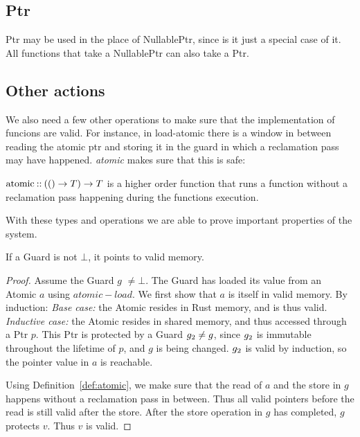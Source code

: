 \subsection{Ptr}

Ptr may be used in the place of NullablePtr, since is it just a special case of it. All functions
that take a NullablePtr can also take a Ptr.


\subsection{Other actions}

We also need a few other operations to make sure that the implementation of funcions are valid.
For instance, in load-atomic there is a window in between reading the atomic ptr and storing it in
the guard in which a reclamation pass may have happened. \emph{atomic} makes sure that this is
safe:
\begin{definition}\label{def:atomic}
  $\text{atomic\:::\:} (() \to T) \to T$ is a higher order function that runs a function without
  a reclamation pass happening during the functions execution.
\end{definition}


\clearpage





With these types and operations we are able to prove important properties of the system.

\begin{theorem}\label{thm:guard-valid}
  If a Guard is not $\bot$, it points to valid memory.
\end{theorem}
\begin{proof}
  Assume the Guard $g$ $\neq \bot$.
  The Guard has loaded its value from an Atomic $a$ using $atomic-load$.
We first show that $a$ is itself in valid memory. By induction:
\emph{Base case:} the Atomic resides in Rust memory, and is thus valid. \emph{Inductive case:} the
Atomic resides in shared memory, and thus accessed through a Ptr $p$.  This Ptr is protected by a
Guard $g\sb{2} \neq g$, since $g\sb{2}$ is immutable throughout the lifetime of $p$, and $g$ is
being changed. $g\sb{2}$ is valid by induction, so the pointer value in $a$ is reachable.

Using Definition~\ref{def:atomic}, we make sure that the read of $a$ and the store in $g$ happens
without a reclamation pass in between. Thus all valid pointers before the read is still valid after
the store.  After the store operation in $g$ has completed, $g$ protects $v$. Thus $v$ is valid.
\end{proof}

